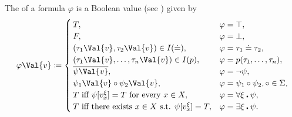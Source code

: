 \begin{definition}
\begin{DefEnum}
     The  of a formula \( \varphi \) is a Boolean value (see ) given by
    \begin{equation}\label{eq:def:first_order_valuation/formula_valuation}
      \varphi\Val{v} \coloneqq \begin{cases}
        T,                                                         &\varphi = \top, \\
        F,                                                         &\varphi = \bot, \\
        (\tau_1\Val{v}, \tau_2\Val{v}) \in I(\doteq),              &\varphi = \tau_1 \doteq \tau_2, \\
        (\tau_1\Val{v}, \ldots, \tau_n\Val{v}) \in I(p),           &\varphi = p(\tau_1, \ldots, \tau_n), \\
        \Ol{\psi\Val{v}},                                          &\varphi = \neg \psi, \\
        \psi_1\Val{v} \circ \psi_2\Val{v},                         &\varphi = \psi_1 \circ \psi_2, \circ \in \Sigma, \\
        T \T{iff} \psi[v_x^\xi] = T \T{for every} x \in X,         &\varphi = \forall \xi \centerdot \psi, \\
        T \T{iff there exists} x \in X \T{s.t.} \psi[v_x^\xi] = T, &\varphi = \exists \xi \centerdot \psi.
      \end{cases}
    \end{equation}
  \end{DefEnum}
\end{definition}

